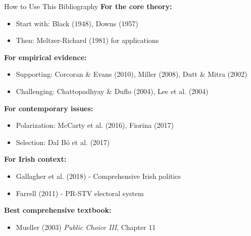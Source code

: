 \documentclass[10pt]{beamer}
\begin{document}
\begin{frame}[allowframebreaks]{How to Use This Bibliography}
\textbf{For the core theory:}
\begin{itemize}
\item Start with: Black (1948), Downs (1957)
\item Then: Meltzer-Richard (1981) for applications
\end{itemize}


\textbf{For empirical evidence:}
\begin{itemize}
\item Supporting: Corcoran \& Evans (2010), Miller (2008), Dutt \& Mitra (2002)
\item Challenging: Chattopadhyay \& Duflo (2004), Lee et al. (2004)
\end{itemize}
 \framebreak   

\textbf{For contemporary issues:}
\begin{itemize}
\item Polarization: McCarty et al. (2016), Fiorina (2017)
\item Selection: Dal Bó et al. (2017)
\end{itemize}


\textbf{For Irish context:}
\begin{itemize}
\item Gallagher et al. (2018) - Comprehensive Irish politics
\item Farrell (2011) - PR-STV electoral system
\end{itemize}


\textbf{Best comprehensive textbook:}
\begin{itemize}
\item Mueller (2003) \emph{Public Choice III}, Chapter 11
\end{itemize}
\end{frame}
\end{document}
